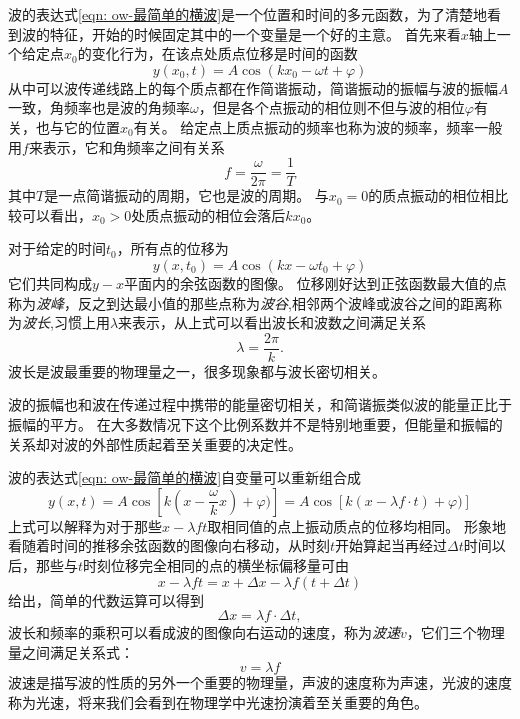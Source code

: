 波的表达式\ref{eqn: ow-最简单的横波}是一个位置和时间的多元函数，为了清楚地看到波的特征，开始的时候固定其中的一个变量是一个好的主意。
首先来看$x$轴上一个给定点$x_0$的变化行为，在该点处质点位移是时间的函数
\begin{equation}
y(x_0,t) = A\cos(kx_0-\omega t +\varphi)
\end{equation}
从中可以波传递线路上的每个质点都在作简谐振动，简谐振动的振幅与波的振幅$A$一致，角频率也是波的角频率$\omega$，但是各个点振动的相位则不但与波的相位$\varphi$有关，也与它的位置$x_0$有关。
给定点上质点振动的频率也称为波的频率，频率一般用$f$来表示，它和角频率之间有关系
\begin{equation}
f = \frac{\omega}{2\pi}=\frac{1}{T}
\end{equation}
其中$T$是一点简谐振动的周期，它也是波的周期。
与$x_0=0$的质点振动的相位相比较可以看出，$x_0>0$处质点振动的相位会落后$kx_0$。

对于给定的时间$t_0$，所有点的位移为
\begin{equation}
y(x,t_0) = A\cos(kx-\omega t_0+\varphi)
\end{equation}
它们共同构成$y-x$平面内的余弦函数的图像。
位移刚好达到正弦函数最大值的点称为\emph{波峰}，反之到达最小值的那些点称为\emph{波谷},相邻两个波峰或波谷之间的距离称为\emph{波长},习惯上用$\lambda$来表示，从上式可以看出波长和波数之间满足关系
\begin{equation}
\lambda = \frac{2\pi}{k}.
\end{equation}
波长是波最重要的物理量之一，很多现象都与波长密切相关。

波的振幅也和波在传递过程中携带的能量密切相关，和简谐振类似波的能量正比于振幅的平方。
在大多数情况下这个比例系数并不是特别地重要，但能量和振幅的关系却对波的外部性质起着至关重要的决定性。

波的表达式\ref{eqn: ow-最简单的横波}自变量可以重新组合成
\begin{equation}
y(x,t) = A\cos\left[k(x-\frac{\omega}{k}x)+\varphi)\right] = A\cos\left[k(x-\lambda f \cdot t)+\varphi)\right]
\end{equation}
上式可以解释为对于那些$x-\lambda f t$取相同值的点上振动质点的位移均相同。
形象地看随着时间的推移余弦函数的图像向右移动，从时刻$t$开始算起当再经过$\Delta t$时间以后，那些与$t$时刻位移完全相同的点的横坐标偏移量可由
\[
x-\lambda f t = x+\Delta x-\lambda f (t+\Delta t)
\]
给出，简单的代数运算可以得到
\[
\Delta x = \lambda f \cdot\Delta t,
\]
波长和频率的乘积可以看成波的图像向右运动的速度，称为\emph{波速}$v$，它们三个物理量之间满足关系式：
\begin{equation}\label{eqn: ow-v=lambad f}
v = \lambda f
\end{equation}
波速是描写波的性质的另外一个重要的物理量，声波的速度称为声速，光波的速度称为光速，将来我们会看到在物理学中光速扮演着至关重要的角色。

